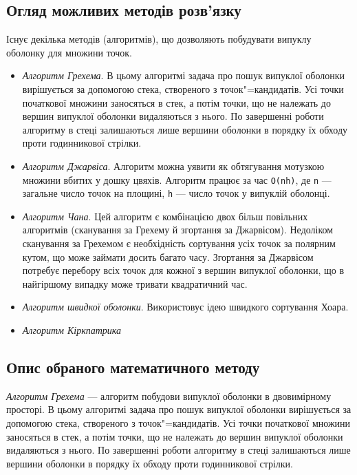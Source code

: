 \documentclass[simple,14pt,utf8,ukrainian]{eskdtext}
\begin{document}
  \subsection{Огляд можливих методів розв’язку}
    Існує декілька методів (алгоритмів), що дозволяють побудувати випуклу
    оболонку для множини точок.
    \begin{itemize}
      \item \emph{Алгоритм Грехема}.
        В цьому алгоритмі задача про пошук випуклої оболонки вирішується за
        допомогою стека, створеного з точок"=кандидатів.
        Усі точки початкової множини заносяться в стек, а потім точки, що не
        належать до вершин випуклої оболонки видаляються з нього.
        По завершенні роботи алгоритму в стеці залишаються лише вершини
        оболонки в порядку їх обходу проти годинникової стрілки.\cite{book3}
    \item \emph{Алгоритм Джарвіса}.
      Алгоритм можна уявити як обтягування мотузкою множини вбитих у дошку
      цвяхів.
      Алгоритм працює за час \verb'O(nh)', де \verb'n' --- загальне число
      точок на площині, \verb'h' --- число точок у випуклій оболонці.\cite{book4}
    \item \emph{Алгоритм Чана}.
      Цей алгоритм є комбінацією двох більш повільних алгоритмів (сканування
      за Грехему й згортання за Джарвісом).
      Недоліком сканування за Грехемом є необхідність сортування усіх точок за
      полярним кутом, що може займати досить багато часу.
      Згортання за Джарвісом потребує перебору всіх точок для кожної з вершин
      випуклої оболонки, що в найгіршому випадку може тривати квадратичний
      час.\cite{book5}
    \item \emph{Алгоритм швидкої оболонки}.
      Використовує ідею швидкого сортування Хоара.
    \item \emph{Алгоритм Кіркпатрика}
  \end{itemize}
  \subsection{Опис обраного математичного методу}
    \emph{Алгоритм Грехема} --- алгоритм побудови випуклої оболонки в
    двовимірному просторі.
    В цьому алгоритмі задача про пошук випуклої оболонки вирішується за
    допомогою стека, створеного з точок"=кандидатів.
    Усі точки початкової множини заносяться в стек, а потім точки, що не
    належать до вершин випуклої оболонки видаляються з нього.
    По завершенні роботи алгоритму в стеці залишаються лише вершини
    оболонки в порядку їх обходу проти годинникової стрілки.
\end{document}
